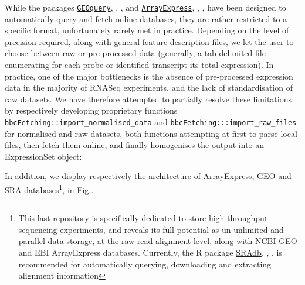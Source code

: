 While the packages \href{http://seandavi.github.io/GEOquery/articles/GEOquery.html}{\texttt{GEOquery}}, \autocite{R-GEOquery}, \autocite{GEOquery2007}, and \href{https://bioconductor.org/packages/release/bioc/vignettes/ArrayExpress/inst/doc/ArrayExpress.pdf}{\texttt{ArrayExpress}}, \autocite{R-ArrayExpress}, \autocite{ArrayExpress2009}, have been designed to automatically query and fetch online databases, they are rather restricted to a specific format, unfortunately rarely met in practice. Depending on the level of precision required, along with general feature description files, we let the user to choose between raw or pre-processed data (generally, a tab-delimited file enumerating for each probe or identified transcript its total expression). In practice, one of the major bottlenecks is the absence of pre-processed expression data in the majority of RNASeq experiments, and the lack of standardisation of raw datasets. We have therefore attempted to partially resolve these limitations by respectively developing proprietary functions \texttt{bbcFetching::import\_normalised\_data} and \texttt{bbcFetching:::import\_raw\_files} for normalised and raw datasets, both functions attempting at first to parse local files, then fetch them online, and finally homogenises the output into an ExpressionSet object:

In addition, we display respectively the architecture of ArrayExpress, GEO and SRA databases\footnote{This last repository is specifically dedicated to store high throughput sequencing experiments, and reveals its full potential as un unlimited and parallel data storage, at the raw read alignment level, along with NCBI GEO and EBI ArrayExpress databases. Currently, the R package \href{http://www.ncbi.nlm.nih.gov/books/NBK47537/}{SRAdb}, \autocite{R-SRAdb}, \autocite{SRAdb2013}, is recommended for automatically querying, downloading and extracting alignment information}, in Fig..


